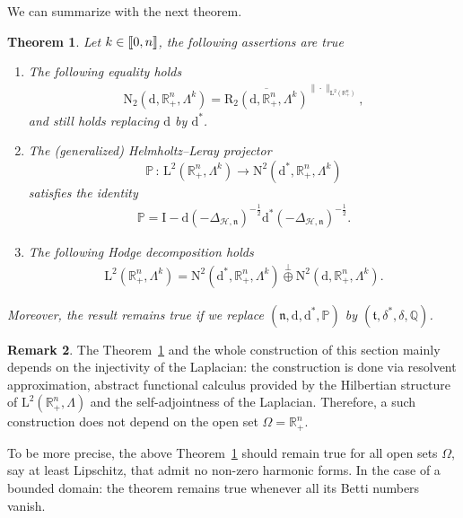 \documentclass[10pt]{amsart}
\newtheorem{theo}{Theorem}[section]
\theoremstyle{definition}\newtheorem{defi}[theo]{Definition}\newtheorem{rema}[theo]{Remark}\newtheorem{exam}[theo]{Example}\newtheorem{exem}[theo]{Example}\newtheorem{nota}[theo]{Notation}
\newcommand{\bbP}{\mathbb{P}}
\newcommand{\bbR}{\mathbb{R}}
\newcommand{\bbQ}{\mathbb{Q}}
\newcommand{\rmd}{\mathrm{d}}
\newcommand{\rmL}{\mathrm{L}}
\newcommand{\rmR}{\mathrm{R}}
\newcommand{\rmN}{\mathrm{N}}
\newcommand{\rmI}{\mathrm{I}}
\newcommand{\clH}{\mathcal{H}}
\newcommand{\fkn}{\mathfrak{n}}
\newcommand{\fkt}{\mathfrak{t}}
\newcommand{\llbracket}{\mathopen{[\mkern -2.7mu[}}
\newcommand{\rrbracket}{\mathclose{]\mkern -2.7mu]}}
\newcommand{\llb}{\llbracket}
\newcommand{\rrb}{\rrbracket}
\begin{document}
We can summarize with the next theorem.

\pagebreak
\begin{theo}\label{thm:HodgeDecompL2Rn+Full}
Let $k\in\llb 0,n\rrb$, the following assertions are true
\begin{enumerate}
\item\label{theo2.21.1} The following equality holds
\begin{align*}
{\rmN }_{2}\left(\rmd,\bbR^n_+,\Lambda^k\right) = \overline{{\rmR }_{2}\left(\rmd,\bbR^n_+,\Lambda^k\right)}^{\|\cdot\|_{{\rmL}^{2}\left(\bbR^n_+\right)}},
\end{align*}
and still holds replacing $\rmd$ by $\rmd^\ast$.
\item\label{theo2.21.2} The (generalized) Helmholtz--Leray projector
\[
\bbP\,:\, {\rmL}^{2}\left(\bbR^n_+,\Lambda^k\right)\longrightarrow {\rmN}^{2}\left(\rmd^\ast,\bbR^n_+,\Lambda^k\right)
\]
satisfies the identity
\begin{align*}
\bbP = \rmI  - \rmd(-\Delta_{\clH,\fkn})^{-\frac{1}{2}}\rmd^\ast(-\Delta_{\clH,\fkn})^{-\frac{1}{2}} .
\end{align*}
\item\label{theo2.21.3} The following Hodge decomposition holds
\begin{align*}
{\rmL}^{2}\left(\bbR^n_+,\Lambda^k\right) = {\rmN}^{2}\left(\rmd^\ast,\bbR^n_+,\Lambda^k\right) \overset{\perp}{\oplus} {\rmN}^{2}\left(\rmd,\bbR^n_+,\Lambda^k\right).
\end{align*}
\end{enumerate}
Moreover, the result remains true if we replace $(\fkn,\rmd,\rmd^\ast,\bbP)$ by $(\fkt,\delta^{\ast},\delta,\bbQ)$.
\end{theo}


\begin{rema}
The Theorem~\ref{thm:HodgeDecompL2Rn+Full} and the whole construction of this section mainly depends on the injectivity of the Laplacian: the construction is done via resolvent approximation, abstract functional calculus provided by the Hilbertian structure of $\rmL^2(\bbR^n_+,\Lambda)$ and the self-adjointness of the Laplacian. Therefore, a such construction does not depend on the open set $\Omega=\bbR^n_+$.

To be more precise, the above Theorem~\ref{thm:HodgeDecompL2Rn+Full} should remain true for all open sets $\Omega$, say at least Lipschitz, that admit no non-zero harmonic forms. In the case of a bounded domain: the theorem remains true whenever all its Betti numbers vanish.
\end{rema}
\end{document}
